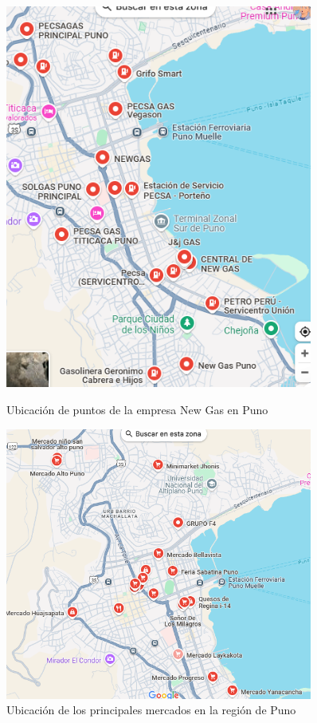 \documentclass[11pt, a4paper]{article}
\begin{document}
\begin{figure}[H]
\centering
\begin{minipage}{0.48\textwidth}
  \centering
  \includegraphics[width=0.9\textwidth]{gas.png}
  \caption{Ubicación de puntos de la empresa New Gas en Puno}
  \label{fig:gas_puntos}
\end{minipage}\hfill
\begin{minipage}{0.48\textwidth}
  \centering
  \includegraphics[width=0.9\textwidth]{mercado.png}
  \caption{Ubicación de los principales mercados en la región de Puno}
  \label{fig:mercados_puntos}
\end{minipage}
\end{figure}
\end{document}
